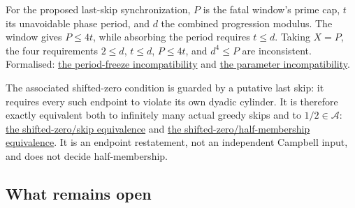 \documentclass[11pt]{article}
\newcommand{\commit}{bb4e24651b37cd096d3749ef299c3317930b3a3b}
\newcommand{\repobase}{https://github.com/wcook04/plectis-lean-erdos249-257/blob/\commit}
\newcommand{\PK}{Erdos249257}
\newcommand{\lword}[4]{\href{\repobase/\PK/#1\#L#2}{#4}}
\theoremstyle{definition}
\theoremstyle{remark}
\begin{document}
{For the proposed last-skip synchronization, \(P\) is the fatal window's
prime cap, \(t\) its unavoidable phase period, and \(d\) the combined
progression modulus.  The window gives \(P\le4t\), while absorbing the
period requires \(t\le d\).  Taking \(X=P\), the four requirements
\(2\le d\), \(t\le d\), \(P\le4t\), and \(d^4\le P\) are inconsistent.
Formalised:
\lword{CampbellShiftSynchronization.lean}{299}{campbellQuarterExponent_periodFreeze_noSync}{the period-freeze incompatibility}
and
\lword{CampbellShiftSynchronization.lean}{320}{campbellPhaseFreeze_parameters_impossible}{the parameter incompatibility}.

The associated shifted-zero condition is guarded by a putative last skip: it
requires every such endpoint to violate its own dyadic cylinder.  It is
therefore exactly equivalent both to infinitely many actual greedy skips and
to $1/2\in\mathcal A$:
\lword{CampbellShiftSynchronization.lean}{471}{shiftWindowZero_iff_greedyMersenneSkippedSupport_infinite}{the shifted-zero/skip equivalence}
and
\lword{CampbellShiftSynchronization.lean}{488}{shiftWindowZero_iff_half_mem_mersenneAchievementSet}{the shifted-zero/half-membership equivalence}.
It is an endpoint restatement, not an independent Campbell input, and does
not decide half-membership.

}

\subsection{What remains open}
\end{document}
